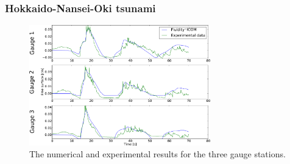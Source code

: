 \begin{frame}
    \frametitle{Hokkaido-Nansei-Oki tsunami}
\begin{figure}
\begin{center}
\includegraphics[width=0.7\textwidth]{hokkaido-nansei-oki_tsunami/MonaiValley_C_p1p1_nu0_01_kmkstab_drag0_002_butcircularoundisland0_2-crop-crop_final2.pdf}
\caption{The numerical and experimental results for the three gauge stations.}\label{fig:monai_results}
\end{center}
\end{figure}
\end{frame}





